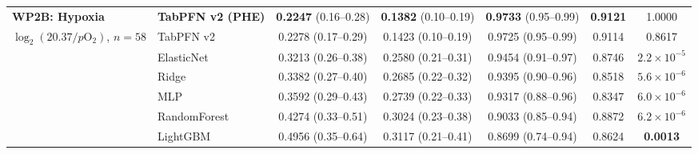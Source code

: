 \documentclass[10pt,a4paper]{article}
\begin{document}
\begin{center}
\begin{tabular}{llccccc}
\midrule
\textbf{WP2B: Hypoxia} & \textbf{TabPFN v2 (PHE)} & \textbf{0.2247} (0.16--0.28) & \textbf{0.1382} (0.10--0.19) & \textbf{0.9733} (0.95--0.99) & \textbf{0.9121} & 1.0000 \\
$\log_2(20.37/p\text{O}_2)$, $n=58$ & TabPFN v2 & 0.2278 (0.17--0.29) & 0.1423 (0.10--0.19) & 0.9725 (0.95--0.99) & 0.9114 & 0.8617 \\
& ElasticNet & 0.3213 (0.26--0.38) & 0.2580 (0.21--0.31) & 0.9454 (0.91--0.97) & 0.8746 & \textbf{$2.2 \times 10^{-5}$} \\
& Ridge & 0.3382 (0.27--0.40) & 0.2685 (0.22--0.32) & 0.9395 (0.90--0.96) & 0.8518 & \textbf{$5.6 \times 10^{-6}$} \\
& MLP & 0.3592 (0.29--0.43) & 0.2739 (0.22--0.33) & 0.9317 (0.88--0.96) & 0.8347 & \textbf{$6.0 \times 10^{-6}$} \\
& RandomForest & 0.4274 (0.33--0.51) & 0.3024 (0.23--0.38) & 0.9033 (0.85--0.94) & 0.8872 & \textbf{$6.2 \times 10^{-6}$} \\
& LightGBM & 0.4956 (0.35--0.64) & 0.3117 (0.21--0.41) & 0.8699 (0.74--0.94) & 0.8624 & \textbf{0.0013} \\
\bottomrule
\end{tabular}
\end{center}
\vspace{0.8cm}
\end{document}
